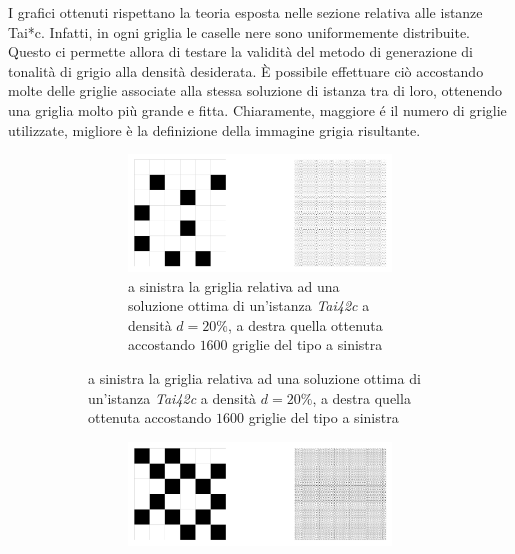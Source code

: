 \newpage \noindent
I grafici ottenuti rispettano la teoria esposta nelle sezione relativa alle istanze Tai*c. Infatti, in ogni griglia le caselle 
nere sono uniformemente distribuite. Questo ci permette allora di testare la validità del metodo di generazione di tonalità di 
grigio alla densità desiderata. È possibile effettuare ciò accostando molte delle griglie associate alla stessa soluzione di istanza tra di loro, 
ottenendo una griglia molto più grande e fitta. Chiaramente, maggiore é il numero di griglie utilizzate, migliore è la definizione 
della immagine grigia risultante.
\begin{figure}[h!]
    \centering
    \begin{subfigure}[b]{\textwidth}
        \centering
        \begin{subfigure}[b]{0.7\textwidth}
            \includegraphics[width=\columnwidth]{images/gray_42_20.png}
            \caption{a sinistra la griglia relativa ad una soluzione ottima di un'istanza \textit{Tai42c} a densità $d=20\%$, 
                \newline a destra quella ottenuta accostando $1600$ griglie del tipo a sinistra}
        \end{subfigure}
    \end{subfigure}
    \centering
    \begin{subfigure}[b]{\textwidth}
        \centering
        \begin{subfigure}[b]{0.7\textwidth}
            \includegraphics[width=\columnwidth]{images/gray_36_40.png}

\end{subfigure}
\end{subfigure}
\end{figure}

